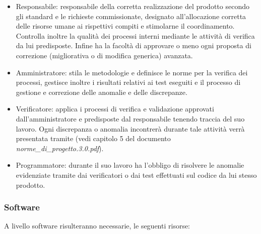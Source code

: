 \begin{itemize}
\item Responsabile: responsabile della corretta realizzazione del prodotto secondo gli standard e le richieste commissionate, designato all'allocazione corretta delle risorse umane ai rispettivi compiti e stimolarne il coordinamento. 
Controlla inoltre la qualità dei processi interni mediante le attività di verifica da lui predisposte. Infine ha la facoltà di approvare o meno ogni proposta di correzione (migliorativa o di modifica generica) avanzata.
\item Amministratore: stila le metodologie e definisce le norme per la verifica dei processi, gestisce inoltre i risultati relativi ai test eseguiti e il processo di gestione e correzione delle anomalie e delle discrepanze.
\item Verificatore: applica i processi di verifica e validazione approvati dall'amministratore e predisposte dal responsabile tenendo traccia del suo lavoro. Ogni discrepanza o anomalia incontrerà durante tale attività verrà presentata tramite  (vedi capitolo 5 del documento \textit{norme\_di\_progetto.3.0.pdf}).
\item Programmatore: durante il suo lavoro ha l'obbligo di risolvere le anomalie evidenziate tramite  dai verificatori o dai test effettuati sul codice da lui stesso prodotto.
\end{itemize}

\subsubsection{Software}
A livello software risulteranno necessarie, le seguenti risorse:


